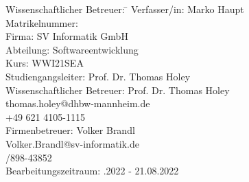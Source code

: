 \begin{titlepage}
\begin{center}
		\begin{minipage}{\textwidth}
			
			\begin{tabbing}
				Wissenschaftlicher Betreuer: \hspace{0.85cm}\=\kill
				Verfasser/in: \> Marko Haupt \\[1.5mm]
				Matrikelnummer:  \\[1.5mm]
				Firma: \> SV Informatik GmbH \\[1.5mm]
				Abteilung: \> Softwareentwicklung \\[1.5mm]
				Kurs: \> WWI21SEA \\[1.5mm]
				Studiengangsleiter: \> Prof. Dr. Thomas Holey  \\[1.5mm]
				Wissenschaftlicher Betreuer: \> Prof. Dr. Thomas Holey \\
				\> thomas.holey@dhbw-mannheim.de \\
				\>+49 621 4105-1115 \\[1.5mm]
				Firmenbetreuer: \> Volker Brandl \\
				\> Volker.Brandl@sv-informatik.de \\
				/898-43852 \\[1.5mm]
				Bearbeitungszeitraum: .2022 - 21.08.2022
			\end{tabbing}
		\end{minipage}
		
	\end{center}
	
\end{titlepage}